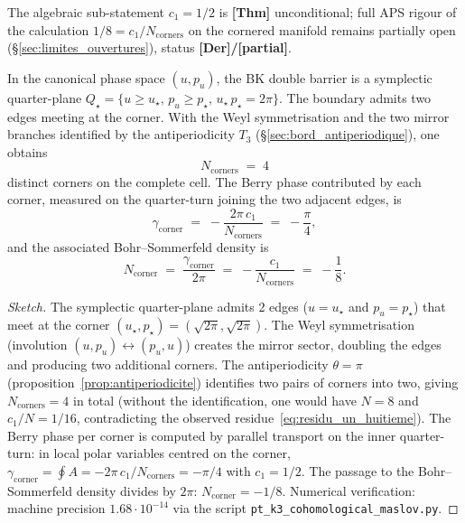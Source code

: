 The algebraic sub-statement $c_1 = 1/2$ is \textbf{[Thm]}
unconditional; full APS rigour of the calculation
$1/8 = c_1/N_{\mathrm{corners}}$ on the cornered manifold remains
partially open (\S\ref{sec:limites_ouvertures}), status
\textbf{[Der]/[partial]}.

\begin{proposition}
\label{prop:c1_sur_N}
In the canonical phase space $(u, p_u)$, the BK double barrier is a
symplectic quarter-plane
$Q_\star = \{u \ge u_\star,\, p_u \ge p_\star,\, u_\star\,p_\star = 2\pi\}$.
The boundary admits two edges meeting at the corner. With the Weyl
symmetrisation and the two mirror branches identified by the
antiperiodicity $T_3$ (\S\ref{sec:bord_antiperiodique}), one obtains
\begin{equation}
N_{\mathrm{corners}} \;=\; 4
\label{eq:Ncoins}
\end{equation}
distinct corners on the complete cell. The Berry phase contributed by
each corner, measured on the quarter-turn joining the two adjacent
edges, is
\begin{equation}
\gamma_{\mathrm{corner}} \;=\; -\dfrac{2\pi\,c_1}{N_{\mathrm{corners}}} \;=\; -\dfrac{\pi}{4},
\label{eq:gamma_corner}
\end{equation}
and the associated Bohr--Sommerfeld density is
\begin{equation}
\boxed{\;N_{\mathrm{corner}} \;=\; \dfrac{\gamma_{\mathrm{corner}}}{2\pi} \;=\; -\dfrac{c_1}{N_{\mathrm{corners}}} \;=\; -\dfrac{1}{8}.\;}
\label{eq:c1_sur_N}
\end{equation}
\end{proposition}

\begin{proof}[Sketch]
The symplectic quarter-plane admits 2 edges ($u = u_\star$ and
$p_u = p_\star$) that meet at the corner
$(u_\star, p_\star) = (\sqrt{2\pi}, \sqrt{2\pi})$. The Weyl
symmetrisation (involution $(u, p_u) \leftrightarrow (p_u, u)$)
creates the mirror sector, doubling the edges and producing two
additional corners. The antiperiodicity $\theta = \pi$
(proposition~\ref{prop:antiperiodicite}) identifies two pairs of
corners into two, giving $N_{\mathrm{corners}} = 4$ in total (without
the identification, one would have $N = 8$ and $c_1/N = 1/16$,
contradicting the observed residue~\eqref{eq:residu_un_huitieme}).
The Berry phase per corner is computed by parallel transport on the
inner quarter-turn: in local polar variables centred on the corner,
$\gamma_{\mathrm{corner}} = \oint A = -2\pi\,c_1/N_{\mathrm{corners}} = -\pi/4$
with $c_1 = 1/2$. The passage to the Bohr--Sommerfeld density divides
by $2\pi$: $N_{\mathrm{corner}} = -1/8$. Numerical verification:
machine precision $1.68 \cdot 10^{-14}$ via the script
\texttt{pt\_k3\_cohomological\_maslov.py}.
\end{proof}

